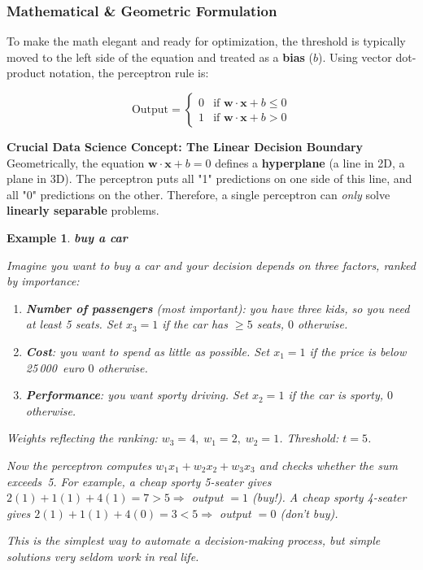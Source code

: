 \documentclass[11pt]{article}
\theoremstyle{smallexample}
\newtheorem{example}{Example}[section]
\newcommand{\vs}{\vspace{0.2\baselineskip}}
\begin{document}
\subsubsection{Mathematical \& Geometric Formulation}
To make the math elegant and ready for optimization, the threshold is typically moved to the left side of the equation and treated as a \textbf{bias} ($b$). Using vector dot-product notation, the perceptron rule is:

\begin{equation}
\text{Output} =
\begin{cases}
0 & \text{if } \mathbf{w} \cdot \mathbf{x} + b \leq 0 \\
1 & \text{if } \mathbf{w} \cdot \mathbf{x} + b > 0
\end{cases}
\end{equation}



\textbf{Crucial Data Science Concept: The Linear Decision Boundary}\\
Geometrically, the equation $\mathbf{w} \cdot \mathbf{x} + b = 0$ defines a \textbf{hyperplane} (a line in 2D, a plane in 3D). The perceptron puts all "1" predictions on one side of this line, and all "0" predictions on the other. Therefore, a single perceptron can \textit{only} solve \textbf{linearly separable} problems.

\vs

\begin{example}{\textbf{buy a car}}

Imagine you want to buy a car and your decision depends on three factors, ranked by importance:

\begin{enumerate}
    \item \textbf{Number of passengers} (most important): you have three kids, so you need at least 5 seats.  
    Set $x_3 = 1$ if the car has $\geq 5$ seats, $0$ otherwise.
    \item \textbf{Cost}: you want to spend as little as possible.  
    Set $x_1 = 1$ if the price is below 25\,000\ euro $0$ otherwise.
    \item \textbf{Performance}: you want sporty driving.  
    Set $x_2 = 1$ if the car is sporty, $0$ otherwise.
\end{enumerate}

Weights reflecting the ranking: $w_3 = 4,\; w_1 = 2,\; w_2 = 1$.  
Threshold: $t = 5$.

Now the perceptron computes $w_1 x_1 + w_2 x_2 + w_3 x_3$ and checks whether the sum exceeds~5.
For example, a cheap sporty 5-seater gives $2(1)+1(1)+4(1)=7>5 \Rightarrow$ output $=1$ (buy!).
A cheap sporty 4-seater gives $2(1)+1(1)+4(0)=3<5 \Rightarrow$ output $=0$ (don't buy).

This is the simplest way to automate a decision-making process, but simple solutions very seldom work in real life.
\end{example}
\end{document}
